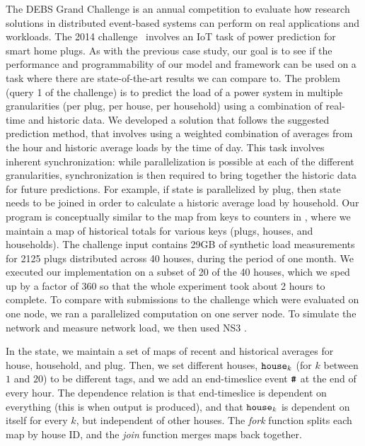 The DEBS Grand Challenge is an annual competition to evaluate how
research solutions in distributed event-based systems can perform on
real applications and workloads.  The 2014
challenge~\cite{jerzak2014debs2014, DEBS2014web} involves an IoT task
of power prediction for smart home plugs.  As with the previous case
study, our goal is to see if the performance and programmability of
our model and framework can be used on a task where there are
state-of-the-art results we can compare to.
The problem (query 1 of the challenge) is to predict the load of a
power system in multiple granularities (per plug, per house, per
household) using a combination of real-time and historic data.  We
developed a solution that follows the suggested prediction method,
that involves using a weighted combination of averages from the hour and
historic average loads by the time of day.  This task involves
inherent synchronization: while parallelization is possible at each of
the different granularities, synchronization is then required to bring
together the historic data for future predictions. For example, if
state is parallelized by plug, then state needs to be joined in order
to calculate a historic average load by household.  Our program
is conceptually similar to the map from keys to counters in
, where we maintain a map of historical totals
for various keys (plugs, houses, and households).  The challenge input
contains 29GB of synthetic load measurements for 2125 plugs
distributed across 40 houses, during the period of one month.  We
executed our implementation on a subset of 20 of the 40 houses, which
we sped up by a factor of 360 so that the whole experiment took about
2 hours to complete.  To compare with submissions to the challenge
which were evaluated on one node, we ran a parallelized computation on
one server node.
To simulate the network and measure network load, we
then used NS3 \cite{carneiro2010ns3}.

In the state, we maintain a set of maps of recent and historical
averages for house, household, and plug.  Then, we set different
houses, $\texttt{house}_k$ (for $k$ between $1$ and $20$) to be
different tags, and we add an end-timeslice event $\texttt{\#}$
at the end of every hour.  The dependence relation is that
end-timeslice is dependent on everything (this is when output is
produced), and that $\texttt{house}_k$ is dependent on itself for every
$k$, but independent of other houses.  The \emph{fork} function
splits each map by house ID, and the \emph{join} function merges
maps back together.

